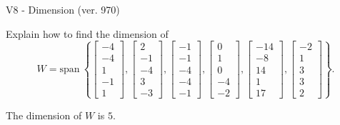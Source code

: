 \begin{exercise}
  \begin{exerciseTitle}V8 - Dimension (ver. 970)\end{exerciseTitle}
  \begin{exerciseStatement}
    Explain how to find the dimension of 
\[W=\mathrm{span}\ \left\{\left[\begin{array}{r}
-4 \\
-4 \\
1 \\
-1 \\
1
\end{array}\right] , \left[\begin{array}{r}
2 \\
-1 \\
-4 \\
3 \\
-3
\end{array}\right] , \left[\begin{array}{r}
-1 \\
-1 \\
-4 \\
-4 \\
-1
\end{array}\right] , \left[\begin{array}{r}
0 \\
1 \\
0 \\
-4 \\
-2
\end{array}\right] , \left[\begin{array}{r}
-14 \\
-8 \\
14 \\
1 \\
17
\end{array}\right] , \left[\begin{array}{r}
-2 \\
1 \\
3 \\
3 \\
2
\end{array}\right]\right\}.\]



  \end{exerciseStatement}
  \begin{exerciseAnswer}
   The dimension of \(W\) is  \(5\).
  


  \end{exerciseAnswer}
\end{exercise}